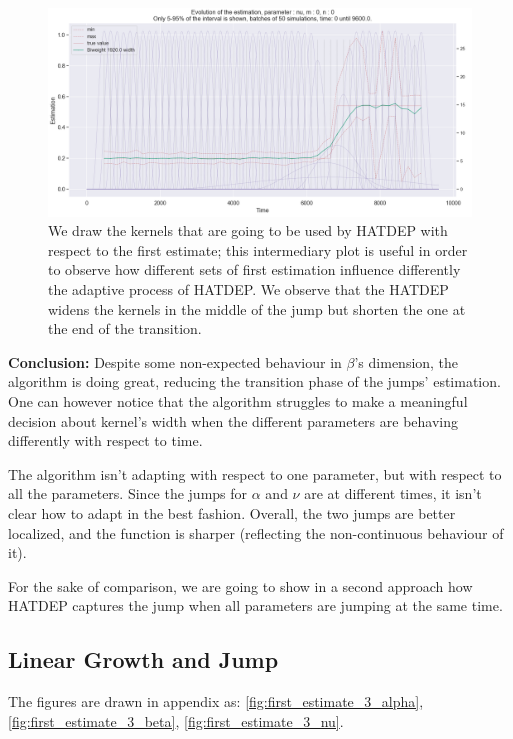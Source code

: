 \begin{figure}
\centering
\includegraphics[width = 0.90 \textwidth]{../imag/chap3/IMPACT_G/jump_all_kernels.png}
\caption{We draw the kernels that are going to be used by HATDEP with respect to the first estimate; this intermediary plot is useful in order to observe how different sets of first estimation influence differently the adaptive process of HATDEP. We observe that the HATDEP widens the kernels in the middle of the jump but shorten the one at the end of the transition.}
\label{fig:impact_g_jump}
\end{figure}


\textbf{Conclusion:} Despite some non-expected behaviour in $\beta$'s dimension, the algorithm is doing great, reducing the transition phase of the jumps' estimation. One can however notice that the algorithm struggles to make a meaningful decision about kernel's width when the different parameters are behaving differently with respect to time. 

\begin{remarque}
The algorithm isn't adapting with respect to one parameter, but with respect to all the parameters. Since the jumps for $\alpha$ and $\nu$ are at different times, it isn't clear how to adapt in the best fashion. Overall, the two jumps are better localized, and the function is sharper (reflecting the non-continuous behaviour of it).

For the sake of comparison, we are going to show in a second approach how HATDEP captures the jump when all parameters are jumping at the same time.
\end{remarque}



\subsection{Linear Growth and Jump}
The figures are drawn in appendix as: \ref{fig:first_estimate_3_alpha}, \ref{fig:first_estimate_3_beta}, \ref{fig:first_estimate_3_nu}.

